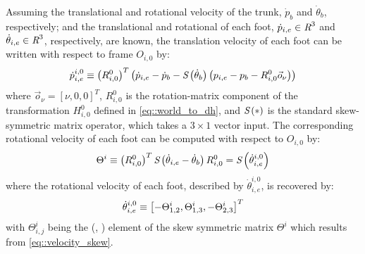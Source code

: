 			Assuming the translational and rotational velocity of the trunk, $\dot{p}_{b}$ and $\dot{\theta}_{b}$, respectively; and the translational and rotational of each \Ith foot, $\dot{p}_{i,e} \in\emph{R}^{3}$ and $\dot{\theta}_{i,e} \in\emph{R}^{3}$, respectively, are known, the translation velocity of each \Ith foot can be written with respect to frame $O_{i,0}$ by:
				\begin{equation}
					\dot{p}_{i,e}^{i,0} \equiv \left(R^{0}_{i,0}\right)^{T} \left( \dot{p}_{i,e} - \dot{p}_{b} - \emph{S}\left( \dot{\theta}_{b} \right) \left( {p}_{i,e} - {p}_{b} - R^{0}_{i,0} \vec{o}_{\nu} \right) \right)
				\end{equation}
			where $\vec{o}_{\nu} = [\nu,0,0]^{T}$, $R^{0}_{i,0}$ is the rotation-matrix component of the transformation $H^{0}_{i,0}$ defined in \ref{eq::world_to_dh}, and $\emph{S}\left(*\right)$ is the standard skew-symmetric matrix operator, which takes a $3\times1$ vector input. The corresponding rotational velocity of each \Ith foot  can be computed with respect to $O_{i,0}$ by:
				\begin{equation}
					\Theta^{i} \equiv \left( R^{0}_{i,0} \right)^{T} \emph{S}\left( \dot{\theta}_{i,e} - \dot{\theta}_{b} \right) R^{0}_{i,0}  = \emph{S}\left( \dot{\theta}^{i,0}_{i,e} \right)
				\label{eq::velocity_skew}
				\end{equation}
			where the rotational velocity of each foot, described by $\dot{\theta}^{i,0}_{i,e}$, is recovered by:
				\begin{equation}
					\dot{\theta}^{i,0}_{i,e} \equiv \left[ 
						-\Theta^{i}_{1,2},
						 \Theta^{i}_{1,3},
						-\Theta^{i}_{2,3}
					\right]^{T}
				\end{equation}
			with $\Theta^{i}_{i,j}$ being the (\Ith, \Jth) element of the skew symmetric matrix $\Theta^{i}$ which results from \ref{eq::velocity_skew}.

